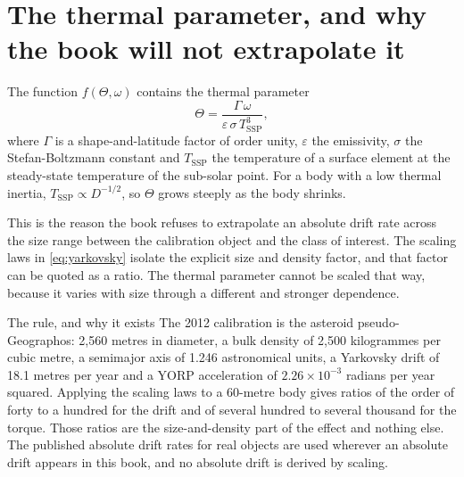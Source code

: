 \section{The thermal parameter, and why the book will not extrapolate it}

The function \(f(\Theta, \omega)\) contains the thermal parameter
\begin{equation}
\Theta = \frac{\Gamma\,\omega}{\varepsilon\,\sigma\,T_{\mathrm{SSP}}^{3}},
\label{eq:theta}
\end{equation}
where \(\Gamma\) is a shape-and-latitude factor of order unity,
\(\varepsilon\) the emissivity, \(\sigma\) the Stefan-Boltzmann constant and
\(T_{\mathrm{SSP}}\) the temperature of a surface element at the
steady-state temperature of the sub-solar point. For a body with a low
thermal inertia, \(T_{\mathrm{SSP}}\propto D^{-1/2}\), so \(\Theta\) grows
steeply as the body shrinks.

This is the reason the book refuses to extrapolate an absolute drift rate
across the size range between the calibration object and the class of
interest. The scaling laws in \eqref{eq:yarkovsky} isolate the explicit size
and density factor, and that factor can be quoted as a ratio. The thermal
parameter cannot be scaled that way, because it varies with size through a
different and stronger dependence.

\begin{deeper}{The rule, and why it exists}
The 2012 calibration is the asteroid pseudo-Geographos: 2,560 metres in
diameter, a bulk density of 2,500 kilogrammes per cubic metre, a semimajor
axis of 1.246 astronomical units, a Yarkovsky drift of 18.1 metres per year
and a YORP acceleration of \(2.26\times10^{-3}\) radians per year squared.
Applying the scaling laws to a 60-metre body gives ratios of the order of
forty to a hundred for the drift and of several hundred to several thousand
for the torque. Those ratios are the size-and-density part of the effect and
nothing else. The published absolute drift rates for real objects are used
wherever an absolute drift appears in this book, and no absolute drift is
derived by scaling.
\end{deeper}

